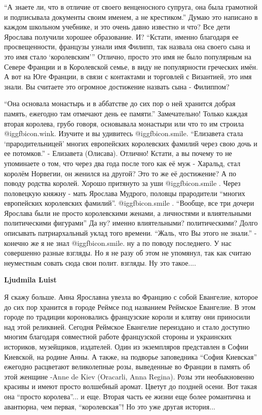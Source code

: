 \begin{itemize}
\begin{itemize}
\begin{itemize}
\enquote{А знаете ли, что в отличие от своего венценосного
супруга, она была грамотной и подписывала документы своим именем, а не
крестиком.} Думаю это написано в каждом школьном учебнике, и это очень давно
известно и что? Все дети Ярослава получили хорошее образование. И? \enquote{Кстати,
именно благодаря ее просвещенности, французы узнали имя Филипп, так назвала она
своего сына и это имя стало \enquote{королевским}} Отлично, просто это имя не было
популярным на Севере Франции и в Королевской семье, в виду не популярности
греческих имён. А вот на Юге Франции, в связи с контактами и торговлей с
Византией, это имя знали. Вы считаете это огромное достижение назвать сына -
Филиппом? 

\enquote{Она основала монастырь и в аббатстве до сих пор о ней хранится добрая
память, ежегодно там отмечают день ее памяти.} Замечательно! Только каждая
вторая королева, грубо говоря, основывала монастыри или что то им строила
@igg{fbicon.wink}. Изучите и вы удивитесь  @igg{fbicon.smile}.
\enquote{Елизавета стала \enquote{прародительницей} многих европейских
королевских фамилий через свою дочь и ее потомков.} - Елизавета (Олисава).
Отлично! Кстати, а вы почему то не упоминаете о том, что через два года после
того как её муж - Харальд, стал королём Норвегии, он женился на другой? Это то
же её достижение? А по поводу родства королей. Хорошо притянуто за уши  @igg{fbicon.smile} .
Через половецкую княжну - мать Ярослава Мудрого, половцы прародители \enquote{многих
европейских королевских фамилий}.  @igg{fbicon.smile} . \enquote{Вообще, все три дочери Ярослава были не
просто королевскими женами, а личностями и влиятельными политическими фигурами}
Да ну? именно влиятельными? политическими? Долго описывать патриархальный уклад
того времени. \enquote{Жаль, что Вы этого не знали.} - конечно же я не знал  @igg{fbicon.smile}. ну а по
поводу последнего. У нас совершенно разные взгляды. Но я не разу об этом не
упомянул, так как считаю неуместным совать сюда свои полит. взгляды. Ну это
такое....

\textbf{Ljudmila Luist} 

Я скажу больше. Анна Ярославна увезла во Францию с собой Евангелие, которое до
сих пор хранится в городе Реймсе под названием Реймское Евангелие. В этом
городе по традиции короновались французские короли и клятву они приносили над
этой реликвией. Сегодня Реймское Евангелие переиздано и стало доступно многим
благодаря совместной работе французской стороны и украинских историков,
музейщиков, издателей. Один из экземпляров представлен в Софии Киевской, на
родине Анны. А также, на подворье заповедника \enquote{София Киевская} ежегодно
расцветают великолепные розы, выведенные во Франции в память об этой женщине
-Anne de Kiev (Oracarli, Anna Regina). Розы эти необыкновенно красивы и имеют
просто волшебный аромат. Цветут до поздней осени. Вот такая она \enquote{просто
королева}... и еще. Вторая часть ее жизни еще более романтична и авантюрна, чем
первая, \enquote{королевская}! Но это уже другая история...


\end{itemize}
\end{itemize}
\end{itemize}
